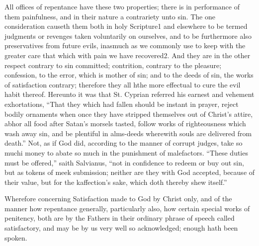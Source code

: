 All offices of repentance have these two properties; there is in performance of them painfulness, and in their nature a contrariety unto sin. The one consideration causeth them both in holy Scripture1 and elsewhere to be termed judgments or revenges taken voluntarily on ourselves, and to be furthermore also preservatives from future evils, inasmuch as we commonly use to keep with the greater care that which with pain we have recovered2. And they are in the other respect contrary to sin committed; contrition, contrary to the pleasure; confession, to the error, which is mother of sin; and to the deeds of sin, the works of satisfaction contrary; therefore they all hthe more effectual to cure the evil habit thereof. Hereunto it was that St. Cyprian referred his earnest and vehement exhortations, “That they which had fallen should be instant in prayer, reject bodily ornaments when once they have stripped themselves out of Christ’s attire, abhor all food after Satan’s morsels tasted, follow works of righteousness which wash away sin, and be plentiful in alms-deeds wherewith souls are delivered from death.” Not, as if God did, according to the manner of corrupt  judges, take so muchi money to abate so much in the punishment of malefactors. “These duties must be offered,” saith Salvianus, “not in confidence to redeem or buy out sin, but as tokens of meek submission; neither are they with God accepted, because of their value, but for the kaffection’s sake, which doth thereby shew itself.”

Wherefore concerning Satisfaction made to God by Christ only, and of the manner how repentance generally, particularly also, how certain special works of penitency, both are by the Fathers in their ordinary phrase of speech called satisfactory, and may be by us very well so acknowledged; enough hath been spoken.

